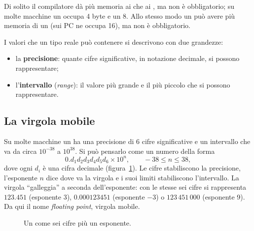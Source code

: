 Di solito il compilatore dà più memoria ai  che ai
, ma non è obbligatorio; su molte macchine un 
occupa 4 byte e un  8. Allo stesso modo un 
può avere più memoria di un  (sui PC ne occupa 16), ma non è
obbligatorio.

I valori che un tipo reale può contenere si descrivono con due grandezze:

\begin{itemize}
  \item la \textbf{precisione}: quante cifre significative, in notazione
        decimale, si possono rappresentare;
  \item l'\textbf{intervallo} (\textit{range}): il valore più grande e il più
        piccolo che si possono rappresentare.
\end{itemize}

\subsection{La virgola mobile}

Su molte macchine un  ha una precisione di 6 cifre significative
e un intervallo che va da circa $10^{-38}$ a $10^{38}$. Si può pensarlo come
un numero della forma
\[
  0.d_1 d_2 d_3 d_4 d_5 d_6 \times 10^{n}, \qquad -38 \le n \le 38,
\]
dove ogni $d_i$ è una cifra decimale (figura~\ref{fig:virgola-mobile}). Le
cifre stabiliscono la precisione, l'esponente $n$ dice dove va la virgola e
i suoi limiti stabiliscono l'intervallo. La virgola “galleggia” a seconda
dell'esponente: con le stesse sei cifre si rappresenta $123.451$ (esponente
3), $0.000123451$ (esponente $-3$) o $123\,451\,000$ (esponente 9). Da qui il
nome \textit{floating point}, virgola mobile.

\begin{figure}[H]
  \centering
  \caption{Un  come sei cifre più un esponente.}
  \label{fig:virgola-mobile}
\end{figure}

